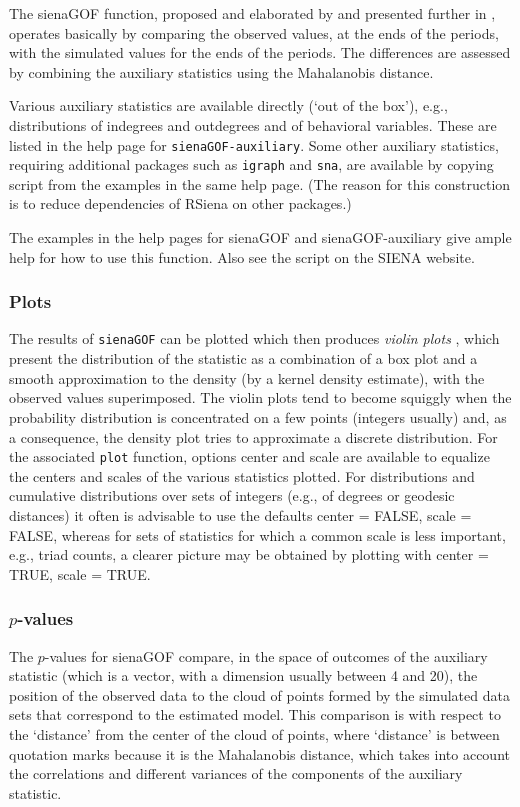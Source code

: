 \documentclass[a4paper,fleqn,11pt]{article}
\newcommand{\+}{\, + \,}
\newcommand{\sfn}[1]{\textsf{#1}}
\newcommand{\RS}{{\sf \textsf{RSiena} }}
\newcommand{\SI}{{\sf SIENA }}
\begin{document}
The \textsf{sienaGOF} function, proposed and elaborated by
\citet{Lospinoso2012} and presented further
in \citet{LospinosoSnijders2019}, operates basically by comparing
the observed values, at the ends of the periods, with the
simulated values for the ends of the periods.
The differences are assessed by combining the auxiliary statistics
using the Mahalanobis distance.

Various auxiliary statistics are available directly (`out of the box'),
e.g., distributions of indegrees and outdegrees and of behavioral
variables. These are listed in the help page for
\verb!sienaGOF-auxiliary!. Some other auxiliary statistics, requiring
additional packages such as \texttt{igraph} and \texttt{sna},
are available by copying script from the examples in the same help page.
(The reason for this construction is to reduce dependencies
of \RS on other packages.)

The examples in the help pages for \textsf{sienaGOF} and \sfn{sienaGOF-auxiliary}
give ample help for how to use this function.
Also see the script on the \SI website.


\subsubsection{Plots}
The results of \verb!sienaGOF! can be plotted which then produces
\emph{violin plots} \citep{HintzeNelson1998}, which present
the distribution of the statistic as a combination
of a box plot and a smooth approximation to the density
(by a kernel density estimate), with the observed values superimposed.
The violin plots tend to become squiggly when the probability distribution
is concentrated on a few points (integers usually) and, as a consequence,
the density plot tries to approximate a discrete distribution.
For the associated \verb!plot! function, options \sfn{center} and \sfn{scale}
are available to equalize the centers and scales of the various statistics
plotted.
For distributions and cumulative distributions over sets of integers
(e.g., of degrees or geodesic distances)
it often is advisable to use the defaults \sfn{center = FALSE},
\sfn{scale = FALSE}, whereas for sets of statistics for which a common scale
is less important, e.g., triad counts, a clearer picture may be obtained by
plotting with \sfn{center = TRUE}, \sfn{scale = TRUE}.

\subsubsection{$p$-values}
The $p$-values for \textsf{sienaGOF} compare, in the space of outcomes
of the auxiliary statistic (which is a vector,
with a dimension usually between 4 and 20),
the position of the observed data to the cloud of
points formed by the simulated data sets that correspond
to the estimated model. This comparison is with respect to the
`distance' from the center of the cloud of points,
where `distance' is between quotation marks because it is the
Mahalanobis distance, which takes into account the correlations
and different variances of the components of the auxiliary statistic.
\end{document}
